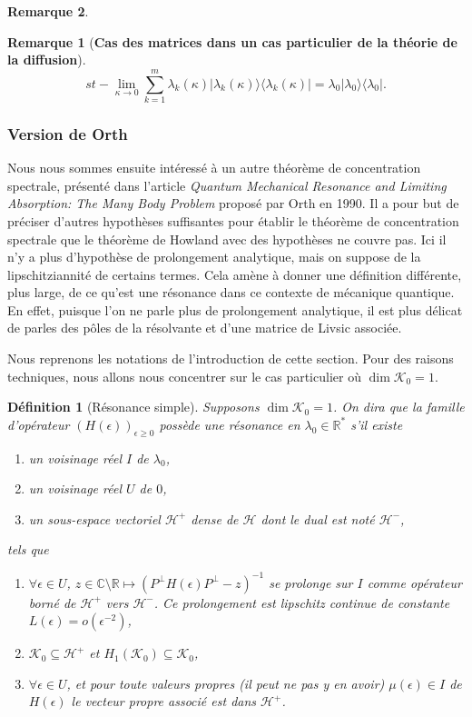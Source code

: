 \documentclass[12pt,openany,a4paper, titlepage]{article}
\newcommand{\lp}{\left(}
\newcommand{\rp}{\right)}
\newcommand{\R}{\mathbb{R}}
\newcommand{\C}{\mathbb{C}}
\newtheorem{Def}{Définition}
\theoremstyle{definition}
\theoremstyle{definition}
\theoremstyle{definition}
\theoremstyle{definition}
\theoremstyle{definition}
\newtheorem{rem}{Remarque}
\theoremstyle{definition}
\begin{document}
\begin{rem}
\begin{rem}[\textbf{Cas des matrices dans un cas particulier de la théorie de la diffusion}]
$$st-\lim\limits_{\kappa\rightarrow 0} \sum_{k=1}^m  \lambda_k(\kappa)|\lambda_k(\kappa)\rangle \langle\lambda_k(\kappa)| = \lambda_0|\lambda_0\rangle\langle\lambda_0|.$$
\end{rem}

\subsubsection{Version de Orth}

Nous nous sommes ensuite intéressé à un autre théorème de concentration spectrale, présenté dans l'article \cite{Orth1990} \textit{Quantum Mechanical Resonance
 and Limiting Absorption: The Many Body Problem} proposé par Orth en 1990. Il a pour but de préciser d'autres hypothèses suffisantes pour établir le théorème de concentration spectrale que le théorème de Howland avec des hypothèses ne couvre pas. Ici il n'y a plus d'hypothèse de prolongement analytique, mais on suppose de la lipschitziannité de certains termes. Cela amène à donner une définition différente, plus large, de ce qu'est une résonance dans ce contexte de mécanique quantique. En effet, puisque l'on ne parle plus de prolongement analytique, il est plus délicat de parles des pôles de la résolvante et d'une matrice de Livsic associée.
 
 Nous reprenons les notations de l'introduction de cette section. Pour des raisons techniques, nous allons nous concentrer sur le cas particulier où $\dim \mathcal{K}_0 = 1$. 

 \begin{Def}[Résonance simple]
     Supposons $\dim \mathcal{K}_0 = 1$. On dira que la famille d'opérateur $(H(\epsilon))_{\epsilon \geq 0}$ possède une résonance en $\lambda_0\in\R^*$ s'il existe
     \begin{enumerate}
         \item un voisinage réel $I$ de $\lambda_0$,
         \item un voisinage réel $U$ de $0$,
         \item un sous-espace vectoriel $\mathcal{H}^+$ dense de $\mathcal{H}$ dont le dual est noté $\mathcal{H}^-$,
     \end{enumerate}
     tels que
     \begin{enumerate}
         \item[a)] $\forall \epsilon\in U$, $z\in\C\setminus\R \mapsto \lp P^\perp H(\epsilon)P^\perp - z\rp^{-1}$ se prolonge sur $I$ comme opérateur borné de $\mathcal{H}^+$ vers $\mathcal{H}^-$. Ce prolongement est lipschitz continue de constante $L(\epsilon) = o(\epsilon^{-2})$,
         \item[b)] $\mathcal{K}_0 \subseteq \mathcal{H}^+$ et $H_1(\mathcal{K}_0) \subseteq \mathcal{K}_0$,
         \item[c)] $\forall \epsilon \in U$, et pour toute valeurs propres (il peut ne pas y en avoir) $\mu(\epsilon) \in I$ de $H(\epsilon)$ le vecteur propre associé est dans $\mathcal{H}^+$.
     \end{enumerate}
 \end{Def}


\end{rem}
\end{document}
